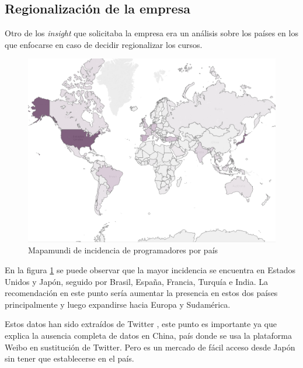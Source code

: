 \clearpage
\subsection{Regionalización de la empresa}
Otro de los \textit{insight} que solicitaba la empresa era un análisis sobre los países en los que enfocarse en caso de decidir regionalizar los cursos.
\begin{figure}[htp!]
	\centering
	\caption{Mapamundi de incidencia de programadores por país}
	\label{Mapamundi}
	\vspace{5pt}
	\includegraphics[scale=0.63]{graficas/CorrectMap}
\end{figure}

En la figura \ref{Mapamundi} se puede observar que la mayor incidencia se encuentra en Estados Unidos y Japón, seguido por Brasil, España, Francia, Turquía e India. La recomendación en este punto sería aumentar la presencia en estos dos países principalmente y luego expandirse hacia Europa y Sudamérica. 

Estos datos han sido extraídos de Twitter \cite{twitter}, este punto es importante ya que explica la ausencia completa de datos en China, país donde se usa la plataforma Weibo \cite{weibo} en sustitución de Twitter. Pero es un mercado de fácil acceso desde Japón sin tener que establecerse en el país.

\clearpage	
